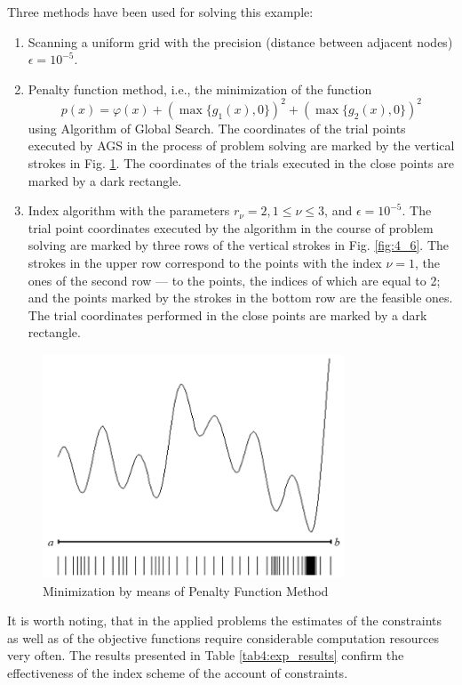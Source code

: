 Three methods have been used for solving this example:
\begin{enumerate}

  \item Scanning a uniform grid with the precision (distance between adjacent nodes) $\epsilon=10^{-5}$.
  \item Penalty function method, i.e., the minimization of the function
  \[
  p(x)=\varphi(x)+(\max\{g_1(x),0\})^2+(\max\{g_2(x),0\})^2
  \]
  using Algorithm of Global Search. The coordinates of the trial points executed by AGS in the process of problem solving are marked by the vertical strokes in Fig. \ref{fig:4_5}. The coordinates of the trials executed in the close points are marked by a dark rectangle.
  \item Index algorithm with the parameters $r_\nu=2, 1\le \nu \le 3$, and $\epsilon =10^{- 5}$. The trial point coordinates executed by the algorithm in the course of problem solving are marked by three rows of the vertical strokes in Fig. \ref{fig:4_6}. The strokes in the upper row correspond to the points with the index $\nu=1$, the ones of the second row --- to the points, the indices of which are equal to 2; and the points marked by the strokes in the bottom row are the feasible ones. The trial coordinates performed in the close points are marked by a dark rectangle.
\end{enumerate}

\begin{figure}[ht]
  \centering
  \includegraphics[width=0.8\textwidth]{figures/4_5.png}
  \caption{Minimization by means of Penalty Function Method}
  \label{fig:4_5}
\end{figure}

It is worth noting, that in the applied problems the estimates of the constraints as well as of the objective functions require considerable computation resources very often. The results presented in Table \ref{tab4:exp_results} confirm the effectiveness of the index scheme of the account of
constraints.


